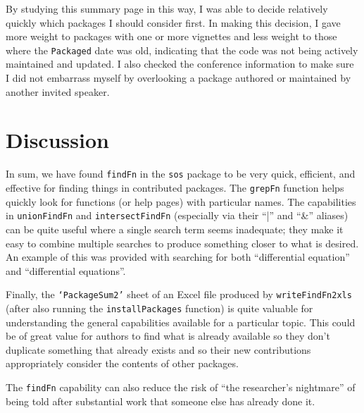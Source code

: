 By studying this summary page in this way, I was able to decide
relatively quickly which packages I should consider first.  In
making this decision, I gave more weight to packages with
one or more vignettes and less weight to those where the
{\tt Packaged} date was old, indicating that the code was not being
actively maintained and updated.  I also checked the conference
information to make sure I did not embarrass myself by overlooking
a package authored or maintained by another invited speaker.

\section*{Discussion}
In sum, we have found {\tt findFn} in the {\tt sos} package to
be very quick, efficient, and effective for finding things in
contributed packages.  The {\tt grepFn} function helps quickly
look for functions (or help pages) with particular names.
The capabilities in {\tt unionFindFn} and {\tt intersectFindFn} 
(especially via their ``|'' and ``\&'' aliases) can be quite useful 
where a single search term seems inadequate;  they make it easy 
to combine multiple searches to produce something closer to what 
is desired.  An example of this was provided with searching for 
both ``differential equation'' and ``differential equations''.

Finally, the {\tt `PackageSum2'} sheet of an Excel file produced by
{\tt writeFindFn2xls} (after also running the {\tt installPackages} 
function) is quite valuable for understanding the
general capabilities available for a particular topic.
This could be of great value for authors to find what is already
available so they don't duplicate something that already exists
and so their new contributions appropriately consider
the contents of other packages.

The {\tt findFn} capability can also reduce the risk
of ``the researcher's nightmare'' of being told after
substantial work that someone else has already done it.

